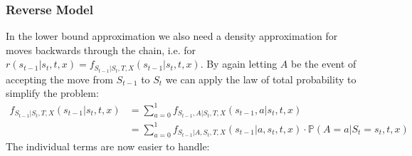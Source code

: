 \documentclass[12pt]{scrartcl}
\begin{document}
\subsubsection{Reverse Model}
\label{sec:TransDensitiesWithAcceptReverse}
In the lower bound approximation we also need a density approximation for moves backwards through the chain, i.e. for $r(s_{t-1}|s_t, t, x) = f_{S_{t-1}|S_t,T, X}(s_{t-1} | s_t, t, x)$. By again letting $A$ be the event of accepting the move from $S_{t-1}$ to $S_t$ we can apply the law of total probability to simplify the problem:
\begin{equation}
\begin{split}
f_{S_{t-1}|S_t, T, X}(s_{t-1} | s_t, t, x) &= \sum_{a=0}^1 f_{S_{t-1}, A|S_t, T, X}(s_{t-1}, a | s_t, t, x) \\
&= \sum_{a=0}^1 f_{S_{t-1} |A, S_t, T, X}(s_{t-1} | a, s_t, t, x) \cdot \mathbb{P}(A = a | S_{t} = s_{t}, t, x)
\end{split}
\end{equation}
The individual terms are now easier to handle:
\end{document}
